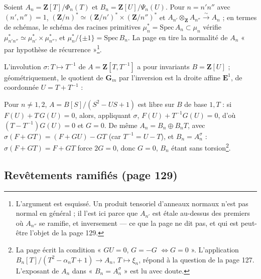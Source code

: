 \documentclass[11pt,a4paper]{article}
\begin{document}
Soient $A_n = \mathbf{Z}[T]/\Phi_n(T)$ et $B_n = \mathbf{Z}[U]/\Psi_n(U)$. Pour
$n = n' n''$ avec $(n', n'') = 1$, $(\mathbf{Z}/n)^{*} \simeq
(\mathbf{Z}/n')^{*} \times (\mathbf{Z}/n'')^{*}$ et $A_{n'} \otimes_{\mathbf{Z}}
A_{n''} \xrightarrow{\sim} A_n$ ; en termes de schémas, le schéma des racines
primitives $\mu_n^{*} = \mathrm{Spec}\, A_n \subset \mu_n$ vérifie
$\mu^{*}_{n'n''} \simeq \mu^{*}_{n'} \times \mu^{*}_{n''}$, et $\mu_n^{*}/\{\pm
1\} = \mathrm{Spec}\, B_n$. La page en tire la normalité de $A_n$ « par
hypothèse de récurrence »\footnote{L'argument est esquissé. Un produit
tensoriel d'anneaux normaux n'est pas normal en général ; il l'est ici parce
que $A_{n'}$ est étale au-dessus des premiers où $A_{n''}$ se ramifie, et
inversement --- ce que la page ne dit pas, et qui est peut-être l'objet de la
page 129.}.

L'involution $\sigma : T \mapsto T^{-1}$ de $A = \mathbf{Z}[T, T^{-1}]$ a pour
invariants $B = \mathbf{Z}[U]$ ; géométriquement, le quotient de
$\mathbf{G}_m$ par l'inversion est la droite affine $\mathbf{E}^1$, de
coordonnée $U = T + T^{-1}$ :
Pour $n \neq 1, 2$, $A = B[S]/(S^2 - US + 1)$ est libre sur $B$ de base $1,
T$ : si $F(U) + T\,G(U) = 0$, alors, appliquant $\sigma$, $F(U) + T^{-1} G(U)
= 0$, d'où $(T - T^{-1}) G(U) = 0$ et $G = 0$. De même $A_n = B_n \oplus B_n
T$, avec $\sigma(F + GT) = (F + GU) - GT$ (car $T^{-1} = U - T$), et
$B_n = A_n^{\sigma}$ : $\sigma(F + GT) = F + GT$ force $2G = 0$, donc $G = 0$,
$B_n$ étant sans torsion\footnote{La page écrit la condition « $GU = 0$, $G =
-G$ $\iff G = 0$ ». L'application $B_n[T]/(T^2 - \alpha_n T + 1) \to A_n$,
$T \mapsto \xi_n$, répond à la question de la page 127. L'exposant de $A_n$
dans « $B_n = A_n^{\sigma}$ » est lu avec doute.}.

\subsection*{Revêtements ramifiés (page 129)}
\end{document}
